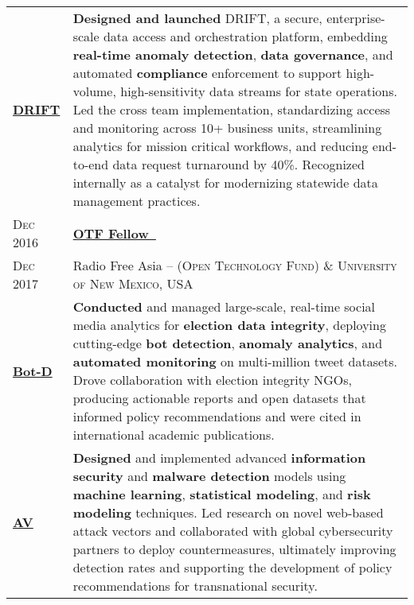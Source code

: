\documentclass[10pt, letterpaper]{article}
\newcommand{\blueExtArrow}{\textsuperscript{\textcolor{primaryColor}{\tiny \faExternalLink*}}}
\newcommand{\edudate}[1]{\hspace{0.6em}#1}
\begin{document}
\begin{tabularx}{\textwidth}{@{}L@{\hspace{1.2em}}J@{}}
\edudate{\href{https://github.com/}{\textbf{DRIFT} \blueExtArrow}} & \textbf{Designed and launched} DRIFT, a secure, enterprise-scale data access and orchestration platform, embedding \textbf{real-time anomaly detection}, \textbf{data governance}, and automated \textbf{compliance} enforcement to support high-volume, high-sensitivity data streams for state operations. Led the cross team implementation, standardizing access and monitoring across 10+ business units, streamlining analytics for mission critical workflows, and reducing end-to-end data request turnaround by 40\%. Recognized internally as a catalyst for modernizing statewide data management practices.\\[6.9em]

\edudate{\scshape Dec 2016} & \textbf{\href{https://www.opentech.fund/}{OTF Fellow~\blueExtArrow}} \\
\edudate{\scshape Dec 2017} & Radio Free Asia -- (\textsc{Open Technology Fund)} \& {\scshape{University of New Mexico, USA}}\\ [0.3em]

\edudate{\href{https://ieeexplore.ieee.org/}{\textbf{Bot-D} \blueExtArrow}} & \textbf{Conducted} and managed large-scale, real-time social media analytics for \textbf{election data integrity}, deploying cutting-edge \textbf{bot detection}, \textbf{anomaly analytics}, and \textbf{automated monitoring} on multi-million tweet datasets. Drove collaboration with election integrity NGOs, producing actionable reports and open datasets that informed policy recommendations and were cited in international academic publications.\\[4.0em]

\edudate{\href{https://github.com/}{\textbf{AV} \blueExtArrow}} & \textbf{Designed} and implemented advanced \textbf{information security} and \textbf{malware detection} models using \textbf{machine learning}, \textbf{statistical modeling}, and \textbf{risk modeling} techniques. Led research on novel web-based attack vectors and collaborated with global cybersecurity partners to deploy countermeasures, ultimately improving detection rates and supporting the development of policy recommendations for transnational security.\\[1.5em]

\end{tabularx}

\end{document}
